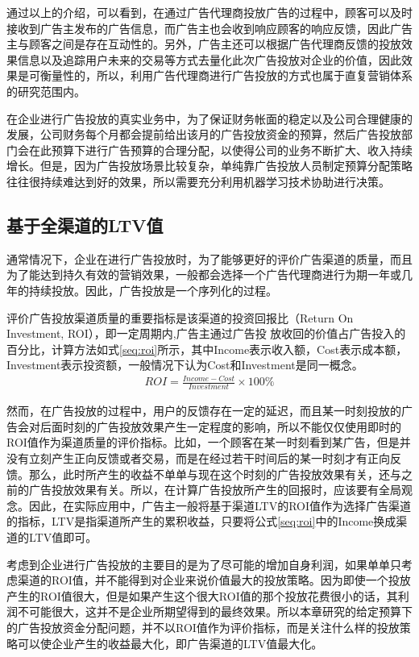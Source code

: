 通过以上的介绍，可以看到，在通过广告代理商投放广告的过程中，顾客可以及时接收到广告主发布的广告信息，而广告主也会收到响应顾客的响应反馈，因此广告主与顾客之间是存在互动性的。另外，广告主还可以根据广告代理商反馈的投放效果信息以及追踪用户未来的交易等方式去量化此次广告投放对企业的价值，因此效果是可衡量性的，所以，利用广告代理商进行广告投放的方式也属于直复营销体系的研究范围内。

在企业进行广告投放的真实业务中，为了保证财务帐面的稳定以及公司合理健康的发展，公司财务每个月都会提前给出该月的广告投放资金的预算，然后广告投放部门会在此预算下进行广告预算的合理分配，以使得公司的业务不断扩大、收入持续增长。但是，因为广告投放场景比较复杂，单纯靠广告投放人员制定预算分配策略往往很持续难达到好的效果，所以需要充分利用机器学习技术协助进行决策。

\subsection{基于全渠道的LTV值}
通常情况下，企业在进行广告投放时，为了能够更好的评价广告渠道的质量，而且为了能达到持久有效的营销效果，一般都会选择一个广告代理商进行为期一年或几年的持续投放。因此，广告投放是一个序列化的过程。

评价广告投放渠道质量的重要指标是该渠道的投资回报比（Return On Investment, ROI），即一定周期内,广告主通过广告投
放收回的价值占广告投入的百分比，计算方法如式\eqref{seq:roi}所示，其中Income表示收入额，Cost表示成本额，Investment表示投资额，一般情况下认为Cost和Investment是同一概念。
\begin{equation}\label{seq:roi}
\begin{aligned}
 ROI=\frac{Income-Cost}{Investment} \times 100\%
\end{aligned}
\end{equation}

然而，在广告投放的过程中，用户的反馈存在一定的延迟，而且某一时刻投放的广告会对后面时刻的广告投放效果产生一定程度的影响，所以不能仅仅使用即时的ROI值作为渠道质量的评价指标。比如，一个顾客在某一时刻看到某广告，但是并没有立刻产生正向反馈或者交易，而是在经过若干时间后的某一时刻才有正向反馈。那么，此时所产生的收益不单单与现在这个时刻的广告投放效果有关，还与之前的广告投放效果有关。所以，在计算广告投放所产生的回报时，应该要有全局观念。因此，在实际应用中，广告主一般将基于渠道LTV的ROI值作为选择广告渠道的指标，LTV是指渠道所产生的累积收益，只要将公式\eqref{seq:roi}中的Income换成渠道的LTV值即可。

考虑到企业进行广告投放的主要目的是为了尽可能的增加自身利润，如果单单只考虑渠道的ROI值，并不能得到对企业来说价值最大的投放策略。因为即使一个投放产生的ROI值很大，但是如果产生这个很大ROI值的那个投放花费很小的话，其利润不可能很大，这并不是企业所期望得到的最终效果。所以本章研究的给定预算下的广告投放资金分配问题，并不以ROI值作为评价指标，而是关注什么样的投放策略可以使企业产生的收益最大化，即广告渠道的LTV值最大化。

